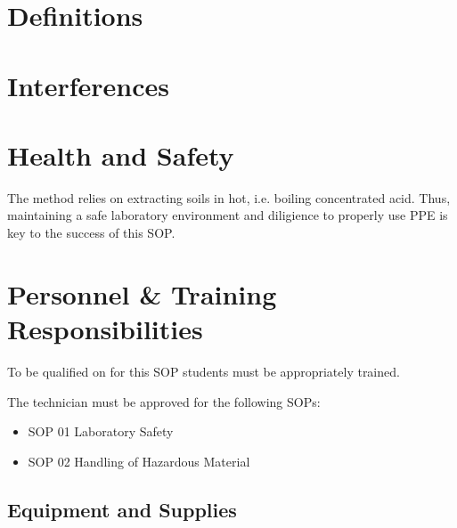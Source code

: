\documentclass[12pt]{../SOP3_alpha}\usepackage[]{graphicx}\usepackage[]{color}
\begin{document}
\section{Definitions}
\section{Interferences}
\section{Health and Safety}

\NP The method relies on extracting soils in hot, i.e. boiling concentrated acid. Thus, maintaining a safe laboratory environment and diligience to properly use PPE is key to the success of this SOP. 


\section{Personnel \& Training Responsibilities}

\NP To be qualified on for this SOP students must be appropriately trained.

The technician must be approved for the following SOPs:

\begin{itemize}
  \item SOP 01 Laboratory Safety
  \item SOP 02 Handling of Hazardous Material
\end{itemize}


\subsection{Equipment and Supplies}
\end{document}
